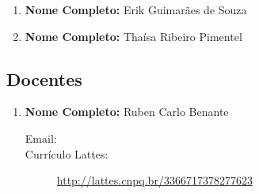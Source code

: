 \documentclass[a4paper,12pt]{article} %
\begin{document}
\begin{enumerate}
    \item \textbf{Nome Completo:} Erik Guimarães de Souza

    \item \textbf{Nome Completo:} Thaísa Ribeiro Pimentel
\end{enumerate}

\subsection*{Docentes}

\begin{enumerate}
    \item \textbf{Nome Completo:} Ruben Carlo Benante
    \begin{description}
        \item [Email:] 
        \item [Currículo Lattes:] \url{http://lattes.cnpq.br/3366717378277623}
    \end{description}
\end{enumerate}



\end{document}
